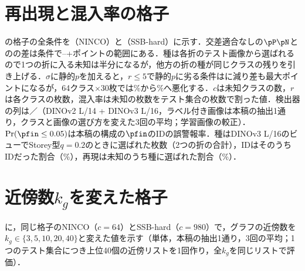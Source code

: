 \section{再出現と混入率の格子}
\label{sec:app_rec}
の格子の全条件を（NINCO）と（SSB-hard）に示す．交差適合なしの$\pP\pN$との\FPR{}の差は\NRecNAll{}条件で\NRecMinMainMinusVOne{}--+\NRecMaxMainMinusVOne{}ポイントの範囲にある．種は各折のテスト画像から選ばれるので1つの折に入る未知は半分になるが，他方の折の種が同じクラスの残りを引き上げる．$\sigma$に静的$p$を加えると，$r\le5$で静的$p$に劣る条件は\NRecNRLeFivePpsWorseStatic{}に減り差も最大\NRecMaxPpsMinusStaticLeFive{}ポイントになるが，64クラス$\times$30枚では\NRecNincoCSixFourRThreeZeroMainFpr\%から\NRecNincoCSixFourRThreeZeroPpsFpr\%へ悪化する．$c$は未知クラスの数，$r$は各クラスの枚数，混入率は未知の枚数をテスト集合の枚数で割った値．検出器の列は\AUC{}／\FPR{}（DINOv2 L/14 + DINOv3 L/16，ラベル付き画像は本稿の抽出1通り，クラスと画像の選び方を変えた3回の平均；学習画像の較正）．$\Pr(\pfin\le0.05)$は本稿の構成の$\pfin$のIDの誤警報率．種はDINOv3 L/16のビューでStorey型$q{=}0.2$のときに選ばれた枚数（2つの折の合計），IDはそのうちIDだった割合（\%），再現は未知のうち種に選ばれた割合（\%）．

\begin{table}[htbp]
\centering
\caption{再出現と混入率の格子：NINCO（[\%]）．}
\label{tab:recninco}
\vspace{1.5mm}

\end{table}

\begin{table}[htbp]
\centering
\caption{再出現と混入率の格子：SSB-hard（[\%]）．}
\label{tab:recssb}
\vspace{1.5mm}

\end{table}

\section{近傍数$k_g$を変えた格子}
\label{sec:app_kg}
に，同じ格子のNINCO（$c{=}64$）とSSB-hard（$c{=}980$）で，グラフの近傍数を$k_g\in\{3,5,10,20,40\}$と変えた値を示す（単体，本稿の抽出1通り，3回の平均；1つのテスト集合につき上位40個の近傍リストを1回作り，全$k_g$を同じリストで評価）．

